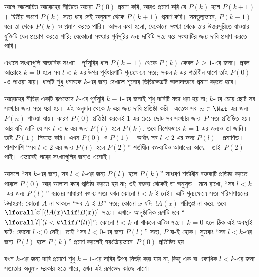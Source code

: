 \documentclass[../../../include/open-logic-section]{subfiles}
\begin{document}


আগে আলোচিত আরোহের নীতিতে আমরা $P(0)$ প্রমাণ করি,
আরও প্রমাণ করি যে $P(k)$ হলে $P(k+1)$। দ্বিতীয় অংশে
$P(k)$ সত্য ধরে সেই অনুমান থেকে $P(k+1)$ প্রমাণ করি।
সমতুল্যভাবে, $P(k-1)$ ধরে তা থেকে $P(k)$-ও প্রমাণ
করতে পারি। আসল কথা হলো, যেকোনো সংখ্যা থেকে তার
উত্তরসূরিতে যাওয়ার যুক্তিটি যেন প্রয়োগ করতে পারি:
যেকোনো সংখ্যার পূর্বসূরির জন্য দাবিটি সত্য ধরে সংখ্যাটির
জন্য দাবি প্রমাণ করতে পারি।

\par\smallskip\noindent এখানে সংখ্যাগুলি স্বাভাবিক সংখ্যা। পূর্বসূরির ধাপ $P(k-1)$ থেকে $P(k)$ কেবল $k\geq 1$-এর জন্য। প্রবল আরোহে $k=0$ হলে সব $l<k$-এর উপর পূর্বধারণাটি শূন্যক্ষেত্রে সত্য; সকল $k$-এর শর্তাধীন ধাপে তাই $P(0)$-ও পাওয়া যায়। ধাপটি শুধু ধনাত্মক $k$-এর জন্য দেখালে শূন্যের ভিত্তিক্ষেত্রটি আলাদাভাবে প্রমাণ করতে হবে।

আরোহের নীতির একটি রূপভেদে $k$-এর পূর্বসূরি $k-1$-এর
জন্যই শুধু দাবিটি সত্য ধরা হয় না; $k$-এর চেয়ে ছোট
সব সংখ্যার জন্য সত্য ধরা হয়। এই অনুমান থেকে $k$-এর
জন্য দাবি প্রতিষ্ঠা করি। এতেও সব~$n \in \Nat$-এর জন্য
$P(n)$ পাওয়া যায়। কারণ $P(0)$ প্রতিষ্ঠা করলেই $1$-এর
চেয়ে ছোট সব সংখ্যার জন্য~$P$ সত্য প্রতিষ্ঠিত হয়। আর
যদি জানি যে সব $l<k$-এর জন্য $P(l)$ হলে $P(k)$, তবে
বিশেষভাবে $k=1$-এর জন্যও তা জানি। তাই $P(1)$ সিদ্ধান্ত
করি। এখন $P(0)$ ও $P(1)$—অর্থাৎ সব $l<2$-এর জন্য
$P(l)$—প্রমাণিত। পাশাপাশি ``সব $l<2$-এর জন্য $P(l)$
হলে $P(2)$'' শর্তাধীন বক্তব্যটিও আমাদের আছে। তাই~$P(2)$
পাই। এভাবেই পরের সংখ্যাগুলির জন্যও এগোই।

আসলে ``সব $k$-এর জন্য, সব $l<k$-এর জন্য $P(l)$ হলে
$P(k)$'' সাধারণ শর্তাধীন বক্তব্যটি প্রতিষ্ঠা করতে পারলে
$P(0)$ আর আলাদা করে প্রতিষ্ঠা করতে হয় না; ওই বক্তব্য
থেকেই তা অনুসৃত। মনে রাখো, ``সব $l<k$-এর জন্য $P(l)$''
ধরনের সাধারণ বক্তব্য সত্য যখন কোনো $l<k$-ই নেই। এটি
শূন্যক্ষেত্রে সত্য পরিমাণায়নের উদাহরণ: কোনো $A$ না থাকলে
``সব $A$-ই $B$'' সত্য; কোনো $x$ যদি~$!A(x)$ পরিতৃপ্ত না
করে, তবে $\lforall[x][(!A(x) \lif !B(x))]$ সত্য।
এখানে আনুষ্ঠানিক রূপটি হবে ``$\lforall[l][(l < k \lif P(l))]$'';
কোনো $l<k$ না থাকলে এটিও সত্য। $k=0$ হলে ঠিক এই
অবস্থাই ঘটে: কোনো $l<0$ নেই। তাই
``সব $l<0$-এর জন্য $P(l)$'' সত্য, $P$ যা-ই হোক।
সুতরাং ``সব $l<k$-এর জন্য $P(l)$ হলে $P(k)$'' প্রমাণ
করলেই স্বয়ংক্রিয়ভাবে~$P(0)$ প্রতিষ্ঠিত হয়।

যখন $k$-এর জন্য দাবি প্রমাণে শুধু $k-1$-এর দাবির
উপর নির্ভর করা যায় না, কিন্তু এক বা একাধিক $l<k$-এর
জন্য সত্যতার অনুমান দরকার হতে পারে, তখন এই রূপভেদ
কাজে লাগে।
\end{document}
